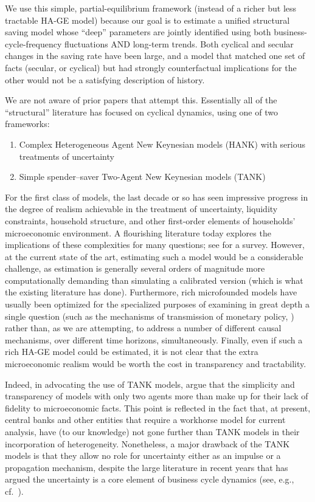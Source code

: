 
We use this simple, partial-equilibrium framework (instead of a richer but less tractable HA-GE model) because our goal is to estimate a unified structural saving model whose ``deep'' parameters are jointly identified using both business-cycle-frequency fluctuations AND long-term trends.  Both cyclical and secular changes in the saving rate have been large, and a model that matched one set of facts (secular, or cyclical) but had strongly counterfactual implications for the other would not be a satisfying description of history.

We are not aware of prior papers that attempt this.  Essentially all of the ``structural'' literature has focused on cyclical dynamics, using one of two frameworks:
\begin{enumerate}
\item Complex Heterogeneous Agent New Keynesian models (HANK) with serious treatments of uncertainty
\item Simple spender--saver Two-Agent New Keynesian models (TANK)
\end{enumerate}

\hypertarget{HA-Model-Too-Hard-Right-Now}{}
\hypertarget{HA-Models-Not-Used-Yet-For-Forecasting}{}
For the first class of models, the last decade or so has seen impressive progress in the degree of realism achievable in the treatment of uncertainty, liquidity constraints, household structure, and other first-order elements of households' microeconomic environment. A flourishing literature today explores the implications of these complexities for many questions; see \cite{kmpHandbook} for a survey. However, at the current state of the art, estimating such a model would be a considerable challenge, as estimation is generally several orders of magnitude more computationally demanding than simulating a calibrated version (which is what the existing literature has done).  Furthermore, rich microfounded models have usually been optimized for the specialized purposes of examining in great depth a single question (such as the mechanisms of transmission of monetary policy, \cite{kmvHANK}) rather than, as we are attempting, to address a number of different causal mechanisms, over different time horizons, simultaneously.  Finally, even if such a rich HA-GE model could be estimated, it is not clear that the extra microeconomic realism would be worth the cost in transparency and tractability.

Indeed, in advocating the use of TANK models, \cite{dgTANK} argue that the simplicity and transparency of models with only two agents more than make up for their lack of fidelity to microeconomic facts.  This point is reflected in the fact that, at present, central banks and other entities that require a workhorse model for current analysis, have (to our knowledge) not gone further than TANK models in their incorporation of heterogeneity. Nonetheless, a major drawback of the TANK models is that they allow no role for uncertainty either as an impulse or a propagation mechanism, despite the large literature in recent years that has argued the uncertainty is a core element of business cycle dynamics (see, e.g., cf.\ \cite{bfjstUncertain}).

